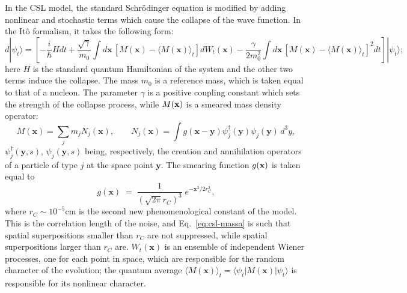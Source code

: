\documentclass[12pt,onecolumn,amssymb,nofootinbib]{revtex4-2} %
\begin{document}
In the CSL model, the standard Schr\"odinger equation is modified by adding nonlinear and stochastic
terms which cause the collapse of the wave function. In the It\^o formalism, it takes the following form:
\begin{equation} \label{eq:csl-massa}
d|\psi_t\rangle = \left[-\frac{i}{\hbar}Hdt +
\frac{\sqrt{\gamma}}{m_{0}}\int d\mathbf{x}\, [M(\mathbf{x}) - \langle M(\mathbf{x}) \rangle_t ]
dW_{t}(\mathbf{x}) - \frac{\gamma}{2m_{0}^{2}} \int d\mathbf{x}\,
[M(\mathbf{x}) - \langle M(\mathbf{x}) \rangle_t ]^2 dt\right] |\psi_t\rangle;
\end{equation}
here $H$ is the standard quantum Hamiltonian of the system and the other two
terms induce the collapse. The mass $m_0$ is a reference mass, which is taken
equal to that of a nucleon. The parameter $\gamma$ is a positive coupling
constant which sets the strength of the collapse process, while $M({\bf x})$ is
a smeared mass density operator:
\begin{equation}
M\left(\mathbf{x}\right)=\underset{j}{\sum}m_{j}N_{j}\left(\mathbf{x}\right),\qquad
N_{j}\left(\mathbf{x}\right)=\int
g\left(\mathbf{x-y}\right)
\psi_{j}^{\dagger}\left(\mathbf{y}\right)\psi_{j}\left(\mathbf{y}\right)\, d^3y,
\end{equation}
$\psi_{j}^{\dagger}\left(\mathbf{y},s\right)$,
$\psi_{j}\left(\mathbf{y},s\right)$ being, respectively, the creation and
annihilation operators of a particle of type $j$ at the space point
$\mathbf{y}$. The smearing function $g({\bf x})$ is taken equal to
\begin{equation} \label{eq:nnbnm}
g(\mathbf{x}) \; = \; \frac{1}{\left(\sqrt{2\pi}r_{C}\right)^{3}}\;
e^{-\mathbf{x}^{2}/2r_{C}^{2}},
\end{equation}
where $r_C \sim 10^{-5}\text{cm}$ is the second new phenomenological constant of the model. This is the correlation length of the noise, and Eq.~\eqref{eq:csl-massa} is such that spatial superpositions smaller than $r_C$ are not suppressed, while spatial superpositions larger than $r_C$ are.  $W_{t}\left(\mathbf{x}\right)$ is an
ensemble of independent Wiener processes, one for each point in space, which are responsible for the random character of the evolution; the quantum average $\langle M(\mathbf{x}) \rangle_t = \langle \psi_t | M(\mathbf{x}) | \psi_t \rangle$ is responsible for its nonlinear character.
\end{document}
